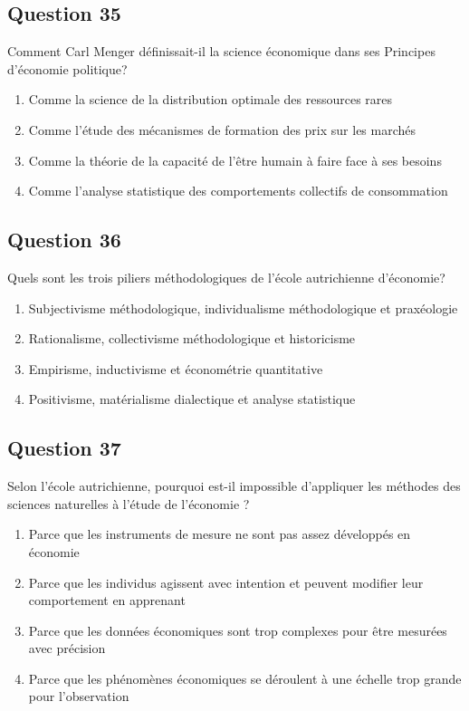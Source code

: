 \documentclass[12pt,a4paper]{article}
\begin{document}
\bigskip


\subsection*{Question 35}
Comment Carl Menger définissait-il la science économique dans ses Principes d'économie politique?

\begin{enumerate}[label=\Alph*., leftmargin=*]
\item Comme la science de la distribution optimale des ressources rares
\item Comme l'étude des mécanismes de formation des prix sur les marchés
\item Comme la théorie de la capacité de l'être humain à faire face à ses besoins
\item Comme l'analyse statistique des comportements collectifs de consommation
\end{enumerate}

\bigskip


\subsection*{Question 36}
Quels sont les trois piliers méthodologiques de l'école autrichienne d'économie?

\begin{enumerate}[label=\Alph*., leftmargin=*]
\item Subjectivisme méthodologique, individualisme méthodologique et praxéologie
\item Rationalisme, collectivisme méthodologique et historicisme
\item Empirisme, inductivisme et économétrie quantitative
\item Positivisme, matérialisme dialectique et analyse statistique
\end{enumerate}

\bigskip


\subsection*{Question 37}
Selon l'école autrichienne, pourquoi est-il impossible d'appliquer les méthodes des sciences naturelles à l'étude de l'économie ?

\begin{enumerate}[label=\Alph*., leftmargin=*]
\item Parce que les instruments de mesure ne sont pas assez développés en économie
\item Parce que les individus agissent avec intention et peuvent modifier leur comportement en apprenant
\item Parce que les données économiques sont trop complexes pour être mesurées avec précision
\item Parce que les phénomènes économiques se déroulent à une échelle trop grande pour l'observation
\end{enumerate}
\end{document}
